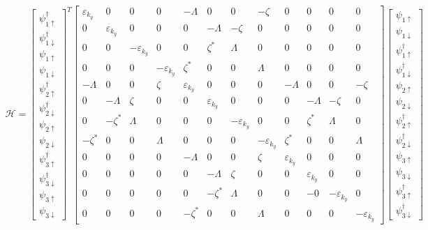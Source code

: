 \documentclass{jarticle}
\begin{document}
\begin{align}
\mathcal{H}=
\begin{bmatrix}
\psi_{1\uparrow}^\dagger \\ 
\psi_{1\downarrow}^\dagger \\ 
\psi_{1\uparrow} \\ 
\psi_{1\downarrow} \\ 
\psi_{2\uparrow}^\dagger \\ 
\psi_{2\downarrow}^\dagger \\ 
\psi_{2\uparrow} \\ 
\psi_{2\downarrow} \\ 
\psi_{3\uparrow}^\dagger \\ 
\psi_{3\downarrow}^\dagger \\ 
\psi_{3\uparrow} \\ 
\psi_{3\downarrow}
\end{bmatrix} 
^T
\begin{bmatrix}
\varepsilon_{k_y} & 0 & 0 & 0 & -\Lambda & 0 & 0 & -\zeta & 0 & 0 & 0 & 0 \\ 
0 & \varepsilon_{k_y} & 0 & 0 & 0 & -\Lambda & -\zeta & 0 & 0 & 0 & 0 & 0 \\ 
0 & 0 & -\varepsilon_{k_y} & 0 & 0 & \zeta^{*} & \Lambda & 0 & 0 & 0 & 0 & 0 \\ 
0 & 0 & 0 & -\varepsilon_{k_y} & \zeta^{*} & 0 & 0 & \Lambda & 0 & 0 & 0 & 0 \\ 
-\Lambda & 0 & 0 & \zeta & \varepsilon_{k_y} & 0 & 0 & 0 & -\Lambda & 0 & 0 & -\zeta \\ 
0 & -\Lambda & \zeta & 0 & 0 & \varepsilon_{k_y} & 0 & 0 & 0 & -\Lambda & -\zeta & 0 \\ 
0 & -\zeta^{*} & \Lambda & 0 & 0 & 0 & -\varepsilon_{k_y} & 0 & 0 & \zeta^{*} & \Lambda & 0 \\ 
-\zeta^{*} & 0 & 0 & \Lambda & 0 & 0 & 0 & -\varepsilon_{k_y} & \zeta^{*} & 0 & 0 & \Lambda \\ 
0 & 0 & 0 & 0 & -\Lambda & 0 & 0 & \zeta & \varepsilon_{k_y} & 0 & 0 & 0 \\ 
0 & 0 & 0 & 0 & 0 & -\Lambda & \zeta & 0 & 0 & \varepsilon_{k_y} & 0 & 0 \\ 
0 & 0 & 0 & 0 & 0 & -\zeta^{*} & \Lambda & 0 & 0 & -0 & -\varepsilon_{k_y} & 0 \\ 
0 & 0 & 0 & 0 & -\zeta^{*} & 0 & 0 & \Lambda & 0 & 0 & 0 & -\varepsilon_{k_y}
\end{bmatrix} 
\begin{bmatrix}
\psi_{1\uparrow} \\ 
\psi_{1\downarrow} \\ 
\psi_{1\uparrow}^\dagger \\ 
\psi_{1\downarrow}^\dagger \\ 
\psi_{2\uparrow} \\ 
\psi_{2\downarrow} \\ 
\psi_{2\uparrow}^\dagger \\ 
\psi_{2\downarrow}^\dagger \\ 
\psi_{3\uparrow} \\ 
\psi_{3\downarrow} \\ 
\psi_{3\uparrow}^\dagger \\ 
\psi_{3\downarrow}^\dagger
\end{bmatrix} 
\end{align}
\end{document}
